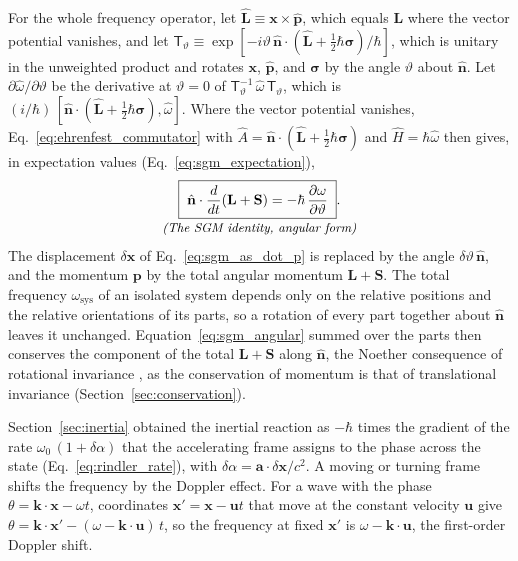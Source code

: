 \documentclass[aps,prd,onecolumn,tightenlines,nofootinbib,notitlepage,11pt,floatfix]{revtex4-2}
\theoremstyle{indentedtheorem}
\begin{document}
For the whole frequency operator, let $\hat{\mathbf{L}}\equiv\mathbf{x}\times\hat{\mathbf{p}}$, which equals $\mathbf{L}$ where the vector potential vanishes, and let $\mathsf{T}_\vartheta\equiv\exp[-i\vartheta\,\hat{\mathbf{n}}\cdot(\hat{\mathbf{L}}+\tfrac{1}{2}\hbar\boldsymbol{\sigma})/\hbar]$, which is unitary in the unweighted product and rotates $\mathbf{x}$, $\hat{\mathbf{p}}$, and $\boldsymbol{\sigma}$ by the angle $\vartheta$ about $\hat{\mathbf{n}}$. Let $\partial\hat{\omega}/\partial\vartheta$ be the derivative at $\vartheta=0$ of $\mathsf{T}_\vartheta^{-1}\,\hat{\omega}\,\mathsf{T}_\vartheta$, which is $(i/\hbar)\,[\hat{\mathbf{n}}\cdot(\hat{\mathbf{L}}+\tfrac{1}{2}\hbar\boldsymbol{\sigma}),\hat{\omega}]$. Where the vector potential vanishes, Eq.~\eqref{eq:ehrenfest_commutator} with $\hat{A}=\hat{\mathbf{n}}\cdot(\hat{\mathbf{L}}+\tfrac{1}{2}\hbar\boldsymbol{\sigma})$ and $\hat{H}=\hbar\hat{\omega}$ then gives, in expectation values (Eq.~\eqref{eq:sgm_expectation}),
\begin{equation}
    \begin{gathered}
    \boxed{\;\hat{\mathbf{n}}\cdot\frac{d}{dt}(\mathbf{L}+\mathbf{S}) = -\hbar\,\frac{\partial\omega}{\partial\vartheta}\;} . \\[-3pt]
    \text{\small\itshape (The SGM identity, angular form)}
    \end{gathered}
    \label{eq:sgm_angular}
\end{equation}
The displacement $\delta\mathbf{x}$ of Eq.~\eqref{eq:sgm_as_dot_p} is replaced by the angle $\delta\vartheta\,\hat{\mathbf{n}}$, and the momentum $\mathbf{p}$ by the total angular momentum $\mathbf{L}+\mathbf{S}$. The total frequency $\omega_\text{sys}$ of an isolated system depends only on the relative positions and the relative orientations of its parts, so a rotation of every part together about $\hat{\mathbf{n}}$ leaves it unchanged. Equation~\eqref{eq:sgm_angular} summed over the parts then conserves the component of the total $\mathbf{L}+\mathbf{S}$ along $\hat{\mathbf{n}}$, the Noether consequence of rotational invariance \citep{Noether1918Invariante,Goldstein2002Classical}, as the conservation of momentum is that of translational invariance (Section~\ref{sec:conservation}).

Section~\ref{sec:inertia} obtained the inertial reaction as $-\hbar$ times the gradient of the rate $\omega_0\,(1+\delta\alpha)$ that the accelerating frame assigns to the phase across the state (Eq.~\eqref{eq:rindler_rate}), with $\delta\alpha=\mathbf{a}\cdot\delta\mathbf{x}/c^2$. A moving or turning frame shifts the frequency by the Doppler effect. For a wave with the phase $\theta=\mathbf{k}\cdot\mathbf{x}-\omega t$, coordinates $\mathbf{x}'=\mathbf{x}-\mathbf{u}t$ that move at the constant velocity $\mathbf{u}$ give $\theta=\mathbf{k}\cdot\mathbf{x}'-(\omega-\mathbf{k}\cdot\mathbf{u})\,t$, so the frequency at fixed $\mathbf{x}'$ is $\omega-\mathbf{k}\cdot\mathbf{u}$, the first-order Doppler shift.
\end{document}
